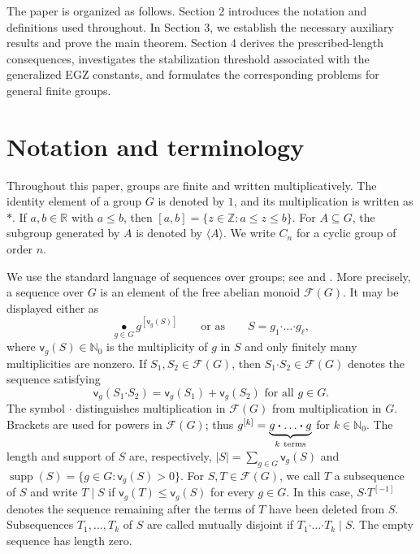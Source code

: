 \documentclass[a4paper, 12pt]{article}
\theoremstyle{definition}
\DeclareMathOperator{\supp}{supp}
\begin{document}
The paper is organized as follows. Section 2 introduces the notation
and definitions used throughout. In Section 3, we establish the
necessary auxiliary results and prove the main theorem. Section 4
derives the prescribed-length consequences, investigates the
stabilization threshold associated with the generalized EGZ
constants, and formulates the corresponding problems for general
finite groups.









\section{Notation and terminology}

Throughout this paper, groups are finite and written multiplicatively.  The
identity element of a group $G$ is denoted by $1$, and its multiplication is
written as $*$.  If $a,b\in\mathbb R$ with $a\leq b$, then
$[a,b]=\{z\in\mathbb Z:a\leq z\leq b\}.$
For $A\subseteq G$, the subgroup generated by $A$ is denoted by
$\langle A\rangle$.  We write $C_n$ for a cyclic group of order $n$.

We use the standard language of sequences over groups; see
\cite{GG2013} and \cite[Chapter 5]{GHK}.  More precisely, a sequence over
$G$ is an element of the free abelian monoid $\mathcal F(G)$.  It may be
displayed either as
$$\mathop{\bullet}\limits_{g\in G} g^{[\mathsf v_g(S)]}
\qquad\text{or as}\qquad
S=g_1\boldsymbol{\cdot}\ldots\boldsymbol{\cdot}g_\ell,$$
where $\mathsf v_g(S)\in\mathbb N_0$ is the multiplicity of $g$ in $S$
and only finitely many multiplicities are nonzero. If $S_1, S_2 \in \mathcal F(G)$, then $S_1 \boldsymbol{\cdot} S_2 \in \mathcal F(G)$ denotes the sequence satisfying $$\mathsf v_g(S_1 \boldsymbol{\cdot} S_2) = \mathsf v_g(S_1) + \mathsf v_g( S_2)  \text{ for all } g \in G.$$
The symbol
$\boldsymbol{\cdot}$ distinguishes multiplication in $\mathcal F(G)$
from multiplication in $G$.  Brackets are used for powers in
$\mathcal F(G)$; thus
$g^{[k]}=\underbrace{g\boldsymbol{\cdot}\ldots
\boldsymbol{\cdot}g}_{k\ {\rm terms}}$
for $k\in\mathbb N_0$.
The length and support of $S$ are, respectively,
$|S|=\sum_{g\in G}\mathsf v_g(S)$ and $\supp(S)=\{g\in G:\mathsf v_g(S)>0\}.$
For $S,T\in\mathcal F(G)$, we call $T$ a subsequence of $S$ and  write $T\mid S$ if
$\mathsf v_g(T)\leq\mathsf v_g(S)$ for every $g\in G$.  In this case,
$S\boldsymbol{\cdot}T^{[-1]}$ denotes the sequence remaining after the
terms of $T$ have been deleted from $S$. Subsequences $T_1,\ldots,T_k$ of
$S$ are called mutually disjoint if
$T_1\boldsymbol{\cdot}\ldots\boldsymbol{\cdot}T_k\mid S.$ The empty sequence has length
zero.
\end{document}
